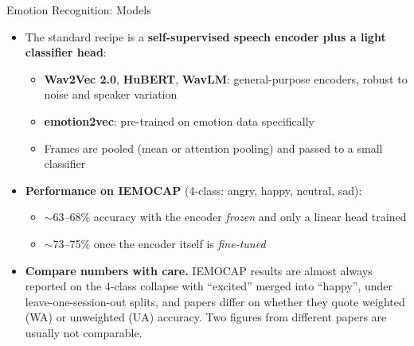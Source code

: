 \begin{frame}[allowframebreaks]{Emotion Recognition: Models}
    \begin{itemize}
        \item The standard recipe is a \textbf{self-supervised speech encoder plus a light classifier head}:
            \begin{itemize}
                \item \textbf{Wav2Vec 2.0}, \textbf{HuBERT}, \textbf{WavLM}: general-purpose encoders, robust to noise and speaker variation
                \item \textbf{emotion2vec}: pre-trained on emotion data specifically
                \item Frames are pooled (mean or attention pooling) and passed to a small classifier
            \end{itemize}
        \item \textbf{Performance on IEMOCAP} (4-class: angry, happy, neutral, sad):
            \begin{itemize}
                \item $\sim$63--68\% accuracy with the encoder \emph{frozen} and only a linear head trained
                \item $\sim$73--75\% once the encoder itself is \emph{fine-tuned}
            \end{itemize}
        \item \textbf{Compare numbers with care.} IEMOCAP results are almost always reported on the 4-class collapse with ``excited'' merged into ``happy'', under leave-one-session-out splits, and papers differ on whether they quote weighted (WA) or unweighted (UA) accuracy. Two figures from different papers are usually not comparable.
    \end{itemize}
\end{frame}

